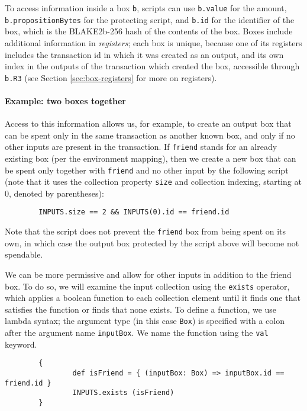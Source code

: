 \documentclass[11pt]{article}
\begin{document}
To access information inside a box \texttt{b}, scripts can use \texttt{b.value} for the amount, \texttt{b.propositionBytes} for the protecting script, and \texttt{b.id} for the identifier of the box, which is the BLAKE2b-256 hash of the contents of the box. Boxes include additional information in \emph{registers};  each box is unique, because one of its registers includes the transaction id in which it was created as an output, and its own index in the outputs of the transaction which created the box, accessible through \texttt{b.R3} (see Section \ref{sec:box-registers} for more on registers).

\paragraph{Example: two boxes together}
Access to this information allows us, for example, to create an output box that can be spent only in the same transaction as another known box, and only if no other inputs are present in the transaction. If \texttt{friend} stands for an already existing box (per the environment mapping), then we create a new box that can be spent only together with \texttt{friend} and no other input by the following script (note that it uses the collection property \texttt{size} and collection indexing, starting at 0, denoted by parentheses):

\begin{verbatim}
        INPUTS.size == 2 && INPUTS(0).id == friend.id
\end{verbatim}

Note that the script does not prevent the \texttt{friend} box from being spent on its own, in which case the output box protected by the script above will become not spendable.

We can be more permissive and allow for other inputs in addition to the friend box. To do so, we will examine the input collection using the \texttt{exists} operator, which applies a boolean function to each collection element until it finds one that satisfies the function or finds that none exists. To define a function, we use lambda syntax; the argument type (in this case \texttt{Box}) is specified with a colon after the argument name \texttt{inputBox}. We name the function using the \texttt{val} keyword.
\begin{verbatim}
        {
                def isFriend = { (inputBox: Box) => inputBox.id == friend.id }
                INPUTS.exists (isFriend)
        }
\end{verbatim}
\end{document}
